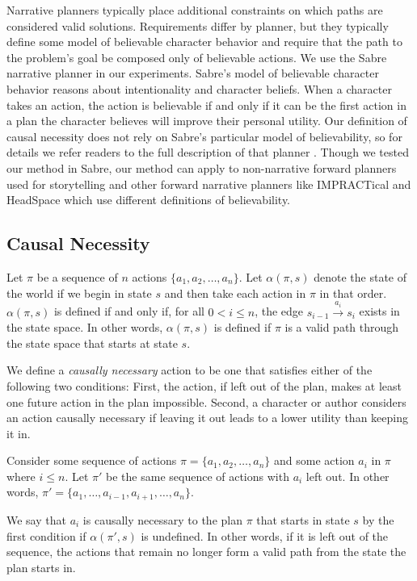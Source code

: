 \documentclass[letterpaper]{article} %
\begin{document}
Narrative planners typically place additional constraints
on which paths are considered valid solutions. Requirements
differ by planner, but they typically define some model of
believable character behavior and require that the path to the
problem’s goal be composed only of believable actions. We
use the Sabre narrative planner \cite{ware2021sabre} in our
experiments. Sabre’s model of believable character behavior
reasons about intentionality and character beliefs. When a
character takes an action, the action is believable if and only
if it can be the first action in a plan the character believes
will improve their personal utility.
Our definition of causal necessity does not rely on Sabre’s
particular model of believability, so for details we refer
readers to the full description of that planner \cite{ware2021sabre}.
Though we tested our method in Sabre, our method can apply to non-narrative forward planners used for
storytelling \cite{porteous2010applying} and other
forward narrative planners like IMPRACTical \cite{teutenberg2015incorporating} and HeadSpace
\cite{sanghrajka2022headspace}
which use different definitions of believability.

\subsection{Causal Necessity}
Let $\pi$ be a sequence of $n$ actions $\{a_1, a_2, \ldots, a_n\}$. Let $\alpha(\pi, s)$ denote the state of the world if we begin in state $s$ and then
take each action in $\pi$ in that order. $\alpha(\pi, s)$ is defined if and
only if, for all $0 < i \leq n$, the edge $s_{i-1} \xrightarrow{a_i}s_i$ exists in the
state space. In other words, $\alpha(\pi, s)$ is defined if $\pi$ is a valid
path through the state space that starts at state $s$.

We define a \textit{causally necessary} action to be one that satisfies either of the following two conditions:
First, the action, if left out of the plan, makes at least one future action in the plan impossible.
Second, a character or author considers an action causally necessary if leaving it out leads to a lower utility than keeping it in.

Consider some sequence of actions $\pi=\{a_1,a_2,\ldots,a_n\}$ and some action $a_i$ in $\pi$ where $i \leq n$. Let $\pi'$ be the same sequence of actions with $a_i$ left out. In other words, $\pi'=\{a_1,\ldots,a_{i-1},a_{i+1},\ldots,a_n\}$.

We say that $a_i$ is causally necessary to the plan $\pi$ that starts in state $s$ by the first condition if $\alpha(\pi',s)$ is undefined. In other
words, if it is left out of the sequence, the actions that remain
no longer form a valid path from the state the plan starts in. 
\end{document}
